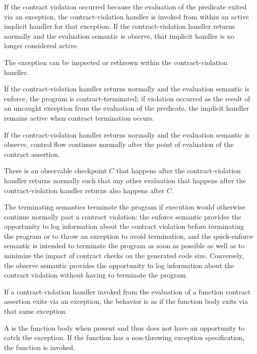 \pnum
If the contract violation occurred
because the evaluation of the predicate
exited via an exception,
the contract-violation handler is invoked
from within an active implicit handler
for that exception.
If the contract-violation handler
returns normally
and the evaluation semantic is observe,
that implicit handler
is no longer considered active.

\begin{note}
The exception can be inspected or rethrown within the contract-violation handler.
\end{note}

\pnum
{}%
If the contract-violation handler
returns normally
and the evaluation semantic is enforce,
the program is contract-terminated;
if violation occurred
as the result of an uncaught exception
from the evaluation of the predicate,
the implicit handler
remains active when contract termination occurs.

\pnum
{}%
\begin{note}
If the contract-violation handler
returns normally
and the evaluation semantic is observe,
control flow continues normally
after the point of evaluation of the contract assertion.
\end{note}

\pnum
There is an observable checkpoint $C$
that happens after the contract-violation handler returns normally
such that any other evaluation
that happens after the contract-violation handler returns
also happens after $C$.

\pnum
\begin{note}
The terminating semantics terminate the program
if execution would otherwise continue normally
past a contract violation:
the enforce semantic provides the opportunity to
log information about the contract violation
before terminating the program
or to throw an exception to avoid termination,
and the quick-enforce semantic is intended
to terminate the program as soon as possible
as well as
to minimize the impact of contract checks
on the generated code size.
Conversely,
the observe semantic
provides the opportunity to
log information about the contract violation
without having to terminate the program.
\end{note}

\pnum
If a contract-violation handler
invoked from the evaluation of a function contract assertion
exits via an exception,
the behavior is as if
the function body exits via that same exception.
\begin{note}
A 
is the function body when present
and thus does not
have an opportunity to catch the exception.
If the function
has a non-throwing exception specification,
the function  is invoked.
\end{note}

